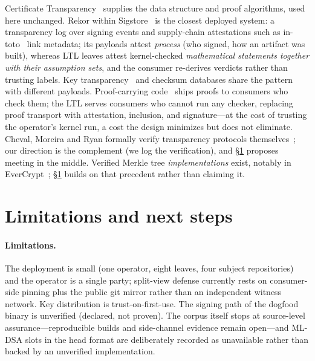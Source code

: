 \documentclass[10pt,twocolumn]{article}
\begin{document}
Certificate Transparency~\cite{rfc6962,rfc9162} supplies the data
structure and proof algorithms, used here unchanged. Rekor within
Sigstore~\cite{sigstore} is the closest deployed system: a transparency
log over signing events and supply-chain attestations such as
in-toto~\cite{intoto} link metadata; its payloads attest \emph{process}
(who signed, how an artifact was built), whereas LTL leaves attest
kernel-checked \emph{mathematical statements together with their
assumption sets}, and the consumer re-derives verdicts rather than
trusting labels. Key transparency~\cite{coniks} and checksum databases
share the pattern with different payloads. Proof-carrying
code~\cite{pcc} ships proofs to consumers who check them; the LTL serves
consumers who cannot run any checker, replacing proof transport with
attestation, inclusion, and signature---at the cost of trusting the
operator's kernel run, a cost the design minimizes but does not
eliminate. Cheval, Moreira and Ryan formally verify transparency
protocols themselves~\cite{cheval}; our direction is the complement
(we log the verification), and \S\ref{sec:next} proposes meeting in the
middle. Verified Merkle tree \emph{implementations} exist, notably in
EverCrypt~\cite{evercrypt}; \S\ref{sec:next} builds on that precedent
rather than claiming it.

\section{Limitations and next steps}
\label{sec:next}

\paragraph{Limitations.} The deployment is small (one operator, eight
leaves, four subject repositories) and the operator is a single party;
split-view defense currently rests on consumer-side pinning plus the
public git mirror rather than an independent witness network. Key
distribution is trust-on-first-use. The signing path of the dogfood
binary is unverified (declared, not proven). The corpus itself stops at
source-level assurance---reproducible builds and side-channel evidence
remain open---and ML-DSA slots in the head format are deliberately
recorded as unavailable rather than backed by an unverified
implementation.
\end{document}
